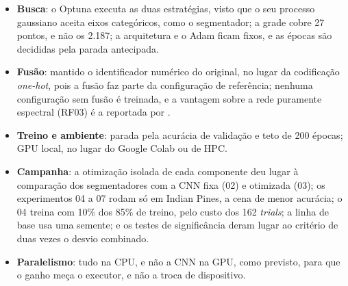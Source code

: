 \begin{itemize}[leftmargin=*, itemsep=0pt, topsep=2pt]
    \item \textbf{Busca}: o Optuna executa as duas estratégias, visto que o seu processo gaussiano aceita eixos categóricos, como o segmentador; a grade cobre 27 pontos, e não os 2.187; a arquitetura e o Adam ficam fixos, e as épocas são decididas pela parada antecipada.
    \item \textbf{Fusão}: mantido o identificador numérico do original, no lugar da codificação \textit{one-hot}, pois a fusão faz parte da configuração de referência; nenhuma configuração sem fusão é treinada, e a vantagem sobre a rede puramente espectral (RF03) é a reportada por .
    \item \textbf{Treino e ambiente}: parada pela acurácia de validação e teto de 200 épocas; GPU local, no lugar do Google Colab ou de HPC.
    \item \textbf{Campanha}: a otimização isolada de cada componente deu lugar à comparação dos segmentadores com a CNN fixa (02) e otimizada (03); os experimentos 04 a 07 rodam só em Indian Pines, a cena de menor acurácia; o 04 treina com 10\% dos 85\% de treino, pelo custo dos 162 \textit{trials}; a linha de base usa uma semente; e os testes de significância deram lugar ao critério de duas vezes o desvio combinado.
    \item \textbf{Paralelismo}: tudo na CPU, e não a CNN na GPU, como previsto, para que o ganho meça o executor, e não a troca de dispositivo.
\end{itemize}
